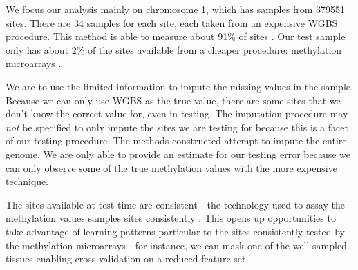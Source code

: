 \documentclass{article} %
\begin{document}
We focus our analysis mainly on chromosome 1, which has samples from 379551 sites. There are 34 samples for each site, each taken from an expensive WGBS procedure. This method is able to measure about 91\% of sites \cite{laird2010principles}. Our test sample only has about 2\% of the sites available from a cheaper procedure: methylation microarrays \cite{zhang2015predicting}.

We are to use the limited information to impute the missing values in the sample. Because we can only use WGBS as the true value, there are some sites that we don't know the correct value for, even in testing. The imputation procedure may {\em not} be specified to only impute the sites we are testing for because this is a facet of our testing procedure. The methods constructed attempt to impute the entire genome. We are only able to provide an estimate for our testing error because we can only observe some of the true methylation values with the more expensive technique.

The sites available at test time are consistent - the technology used to assay the methylation values samples sites consistently \cite{infinium}. This opens up opportunities to take advantage of learning patterns particular to the sites consistently tested by the methylation microarrays - for instance, we can mask one of the well-sampled tissues enabling cross-validation on a reduced feature set.
\end{document}
